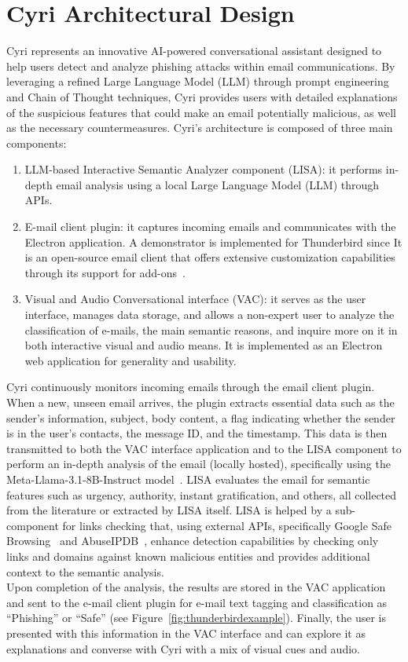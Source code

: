\section{Cyri Architectural Design}
\label{sec:design}
Cyri represents an innovative AI-powered conversational assistant designed to
help users detect and analyze phishing attacks within email communications. By leveraging a refined Large Language Model (LLM) through prompt
engineering and Chain of Thought techniques, Cyri provides users with detailed explanations of the suspicious features that could make an email potentially malicious, as well as the necessary countermeasures. Cyri’s architecture is composed of three main components:
\begin{enumerate}
\item LLM-based Interactive Semantic Analyzer component (LISA): it performs in-depth email analysis using a local Large Language Model (LLM) through APIs.
\item E-mail client plugin: it captures incoming emails and communicates with the
Electron application. A demonstrator is implemented for Thunderbird since It is an open-source email client that offers extensive customization capabilities through its support for add-ons~\cite{b32}.
\item Visual and Audio Conversational interface (VAC): it serves as the user interface, manages data storage, and allows a non-expert user to analyze the classification of e-mails, the main semantic reasons, and inquire more on it in both interactive visual and audio means. It is implemented as an Electron web application for generality and usability.
\end{enumerate}

Cyri continuously monitors incoming emails through the email client plugin. When a new, unseen email arrives, the plugin extracts essential data such as the sender's information, subject, body content, a flag indicating whether the sender is in the user's contacts, the message ID, and the timestamp. This data is then transmitted to both the VAC interface application and to the LISA component to perform an in-depth analysis of the email (locally hosted), specifically using the Meta-Llama-3.1-8B-Instruct model~\cite{b29}. LISA evaluates the email for semantic features such as urgency, authority, instant gratification, and others, all collected from the literature or extracted by LISA itself. LISA is helped by a sub-component for links checking that, using external APIs, specifically Google Safe Browsing~\cite{b30} and AbuseIPDB~\cite{b31}, enhance detection capabilities by checking only links and domains against known malicious entities and provides additional context to the semantic analysis.\\
Upon completion of the analysis, the results are stored in the VAC application and sent to the e-mail client plugin for e-mail text tagging and classification as ``Phishing'' or ``Safe'' (see Figure~\ref{fig:thunderbirdexample}). Finally, the user is presented with this information in the VAC interface and can explore it as explanations and converse with Cyri with a mix of visual cues and audio.

